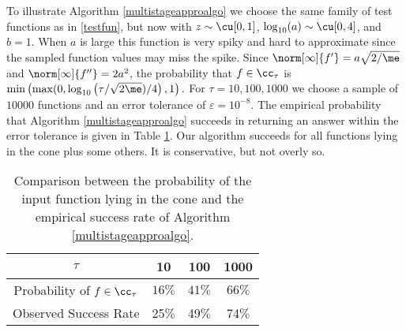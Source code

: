 To illustrate Algorithm \ref{multistageapproalgo} we choose the same  family of test functions as in \eqref{testfun}, but now with $z \sim \cu[0,1]$, $\log_{10}(a) \sim \cu[0,4]$, and $b=1$. When $a$ is large this function is very spiky and hard to approximate since the sampled function values may miss the spike.  Since $\norm[\infty]{f'}=a\sqrt{2/\me}$ and $\norm[\infty]{f''}=2a^2$, the probability that $f \in \cc_{\tau}$ is $\min\left(\max(0,\log_{10}\left(\tau/\sqrt{2\me})/4\right),1\right).$
For $\tau = 10, 100 , 1000$ we choose a sample of  $10000$ functions and an error tolerance of  $\varepsilon = 10^{-8}$.  The empirical probability that Algorithm \ref{multistageapproalgo} succeeds in returning an answer within the error tolerance is given in Table \ref{approxnumerical}.  Our algorithm succeeds for all functions lying in the cone plus some others.  It is conservative, but not overly so.
\begin{table}[h]
\centering
\begin{tabular}{cccc}
$\tau$ &  10 & 100 & 1000\\
\toprule
Probability of $f \in \cc_{\tau}$ &  $ 16 \%$ &  $41 \%$  & $66 \%$ \\
Observed Success Rate & 25$\%$ &  49$\%$  & 74$\%$ \\
\end{tabular}
\caption{Comparison between the probability of the input function lying in the cone and the empirical success rate of Algorithm \ref{multistageapproalgo}.  \label{approxnumerical}}
\end{table}




